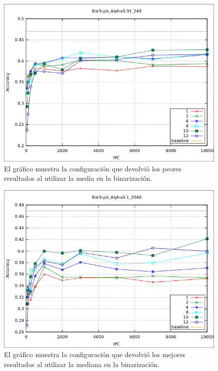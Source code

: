 			\begin{figure}[htbp]
				\centering
				\includegraphics[scale=0.6]{img/resultados/sinteticas/worst_media_8or3cpb_Alpha0,01_240.png}
				\caption[Sintéticas media bajo resultado]{El gráfico muestra la configuración que devolvió los peores resultados al utilizar la media en la binarización.}
				\label{fig: Sinteticas-media-bajo}
			\end{figure}
			
			\begin{figure}[htbp]
				\centering
				\includegraphics[scale=0.6]{img/resultados/sinteticas/best_median_8or3cpb_Alpha0,1_2040.png}
				\caption[Sintéticas mediana mejor resultado]{El gráfico muestra la configuración que devolvió los mejores resultados al utilizar la mediana en la binarización.}
				\label{fig: Sinteticas-median-mejor}
			\end{figure}
	
